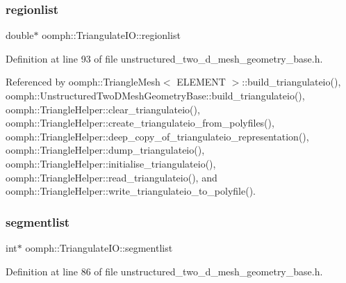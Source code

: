 \mbox{\label{structoomph_1_1TriangulateIO_a758701efdcf2b22bfe6f0dd67c809beb}} 
\subsubsection{\texorpdfstring{regionlist}{regionlist}}
{\footnotesize\ttfamily double$\ast$ oomph\+::\+Triangulate\+I\+O\+::regionlist}



Definition at line 93 of file unstructured\+\_\+two\+\_\+d\+\_\+mesh\+\_\+geometry\+\_\+base.\+h.



Referenced by oomph\+::\+Triangle\+Mesh$<$ E\+L\+E\+M\+E\+N\+T $>$\+::build\+\_\+triangulateio(), oomph\+::\+Unstructured\+Two\+D\+Mesh\+Geometry\+Base\+::build\+\_\+triangulateio(), oomph\+::\+Triangle\+Helper\+::clear\+\_\+triangulateio(), oomph\+::\+Triangle\+Helper\+::create\+\_\+triangulateio\+\_\+from\+\_\+polyfiles(), oomph\+::\+Triangle\+Helper\+::deep\+\_\+copy\+\_\+of\+\_\+triangulateio\+\_\+representation(), oomph\+::\+Triangle\+Helper\+::dump\+\_\+triangulateio(), oomph\+::\+Triangle\+Helper\+::initialise\+\_\+triangulateio(), oomph\+::\+Triangle\+Helper\+::read\+\_\+triangulateio(), and oomph\+::\+Triangle\+Helper\+::write\+\_\+triangulateio\+\_\+to\+\_\+polyfile().

\mbox{\label{structoomph_1_1TriangulateIO_ae462430ddb959339807abcee1b841e54}} 
\subsubsection{\texorpdfstring{segmentlist}{segmentlist}}
{\footnotesize\ttfamily int$\ast$ oomph\+::\+Triangulate\+I\+O\+::segmentlist}



Definition at line 86 of file unstructured\+\_\+two\+\_\+d\+\_\+mesh\+\_\+geometry\+\_\+base.\+h.



